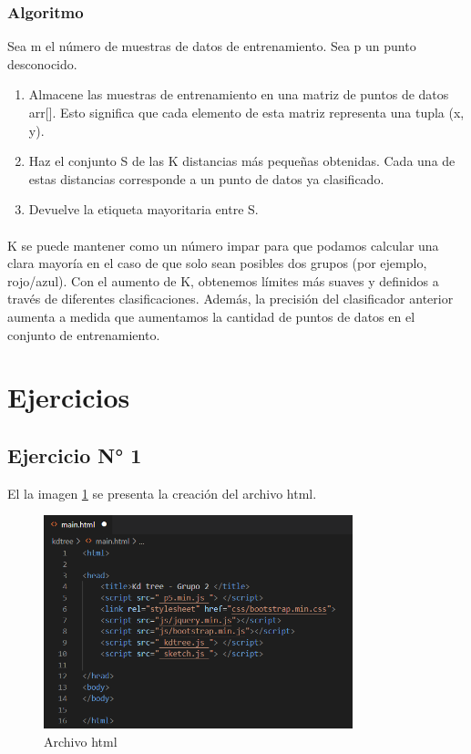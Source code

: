 \documentclass{article}
\begin{document}
\subsubsection{Algoritmo}
Sea m el número de muestras de datos de entrenamiento. Sea p un punto desconocido.

\begin{enumerate}
	\item Almacene las muestras de entrenamiento en una matriz de puntos de datos arr[]. Esto significa que cada elemento de esta matriz representa una tupla (x, y).
	\item Haz el conjunto S de las K distancias más pequeñas obtenidas. Cada una de estas distancias corresponde a un punto de datos ya clasificado.
	\item Devuelve la etiqueta mayoritaria entre S.
\end{enumerate}

\paragraph{}
K se puede mantener como un número impar para que podamos calcular una clara mayoría en el caso de que solo sean posibles dos grupos (por ejemplo, rojo/azul). Con el aumento de K, obtenemos límites más suaves y definidos a través de diferentes clasificaciones. Además, la precisión del clasificador anterior aumenta a medida que aumentamos la cantidad de puntos de datos en el conjunto de entrenamiento.

\section{Ejercicios}

\subsection{Ejercicio N° 1}
El la imagen \ref{fig:ejercicio_01} se presenta la creación del archivo html.
\begin{figure}[h!]
	\centering
	\includegraphics[width=0.8\textwidth]{img/ejercicio_01.png}
	\caption{Archivo html}
	\label{fig:ejercicio_01}
\end{figure}
\end{document}
